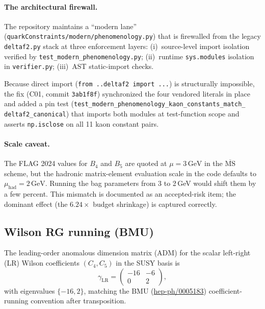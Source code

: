 \documentclass[11pt]{article}
\begin{document}
\paragraph{The architectural firewall.}
The repository maintains a ``modern lane''
(\texttt{quarkConstraints/modern/phenomenology.py}) that is firewalled
from the legacy \texttt{deltaf2.py} stack at three enforcement layers:
(i)~source-level import isolation verified by
\texttt{test\_modern\_phenomenology.py};
(ii)~runtime \texttt{sys.modules} isolation in \texttt{verifier.py};
(iii)~AST static-import checks.

Because direct import (\texttt{from ..deltaf2 import ...}) is
structurally impossible, the fix (C01, commit \texttt{3ab1f8f})
synchronized the four vendored literals in place and added a pin test
(\texttt{test\_modern\_phenomenology\_kaon\_constants\_match\_%
deltaf2\_canonical}) that imports both modules at test-function scope
and asserts \texttt{np.isclose} on all 11 kaon constant pairs.

\paragraph{Scale caveat.}
The FLAG 2024 values for $B_4$ and $B_5$ are quoted at
$\mu = 3\,\mathrm{GeV}$ in the $\overline{\mathrm{MS}}$ scheme, but
the hadronic matrix-element evaluation scale in the code defaults to
$\mu_{\mathrm{had}} = 2\,\mathrm{GeV}$.  Running the bag parameters
from 3 to 2\,GeV would shift them by a few percent.  This mismatch is
documented as an accepted-risk item; the dominant effect (the
$6.24\times$ budget shrinkage) is captured correctly.


\subsection{Wilson RG running (BMU)}
\label{sec:bmu}

The leading-order anomalous dimension matrix (ADM) for the scalar
left-right (LR) Wilson coefficients $(C_4, C_5)$ in the SUSY basis is
\begin{equation}\label{eq:adm-lr}
  \gamma_{\mathrm{LR}} = \begin{pmatrix} -16 & -6 \\
  0 & 2 \end{pmatrix},
\end{equation}
with eigenvalues $\{-16, 2\}$, matching the BMU
(\href{https://arxiv.org/abs/hep-ph/0005183}{hep-ph/0005183})
coefficient-running convention after transposition.
\end{document}
